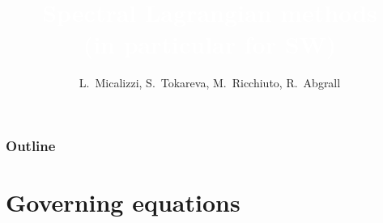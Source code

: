 \documentclass[pt12]{beamer}
\title[]{\textcolor{white}{\bfseries Spectral Lagrangian methods\\ (in particular for SW)}}
\author[Lorenzo Micalizzi] %
{L.~Micalizzi\inst{1,2}, S.~Tokareva\inst{2}, M.~Ricchiuto\inst{3}, R.~Abgrall\inst{1}}
\institute[UZH] %
{
  \inst{1}%
  Institut f{\"u}r Mathematik,\\ 
  Universit{\"a}t Z{\"u}rich
  \and
  \inst{2}%
  Theoretical Division,\\
  Los Alamos National Laboratory
  \and
  \inst{3}%
  Team CARDAMOM,\\
  Inria Bordeaux sud-ouest
}
\date[Los Alamos] %
\begin{document}
\begin{frame}[plain]
\titlepage
\end{frame}



\begin{frame}[label=outline]
\frametitle{Outline}
\tableofcontents%

%
%

\end{frame}

\section{Governing equations}
\frame\sectionpage





\end{document}
